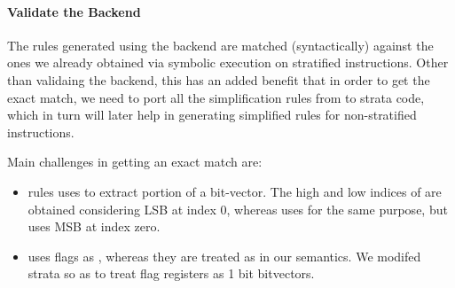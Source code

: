 {    \paragraph{Validate the Backend}
    
    The \K rules generated using the backend are matched (syntactically)  against
    the ones we already obtained via symbolic execution on stratified instructions.
    Other than validaing the backend, this has an added benefit that in order to get
    the exact match, we need to port all the simplification rules from \K to strata
    code, which in turn will later help in generating simplified \K rules for
    non-stratified instructions. 
    
    Main challenges in getting an exact match are:
    \begin{itemize}
        
        \item  \Strata rules uses \extract to extract portion of a bit-vector. The high
        and low indices of \extract are obtained considering LSB at index 0, whereas \K
        uses \extractMInt for the same purpose, but uses MSB at index zero.
        
        \item  \Strata uses flags as \bool, whereas they are treated as \bv in our
        semantics. We modifed strata so as to treat flag registers as 1 bit bitvectors.
        
    \end{itemize}
    
}
